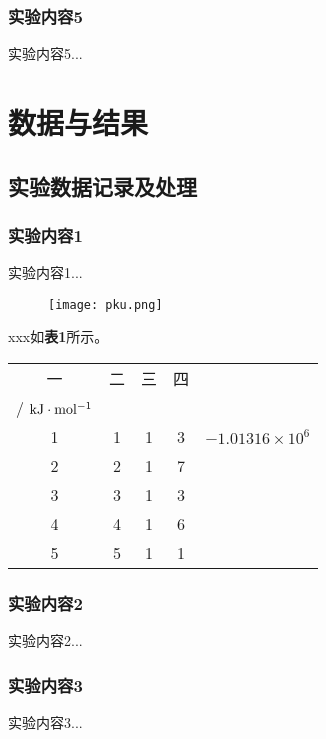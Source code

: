 \documentclass[12pt]{article}
\begin{document}
			\subsubsection{实验内容5}
				实验内容5...
    	
	\vbox{}  
	
	 \section{数据与结果}
 		\subsection{实验数据记录及处理}
 			\subsubsection{实验内容1}
 				实验内容1...
		 		 \begin{figure}[h]
		 			\centering
		 			\texttt{[image: pku.png]}
		 		\end{figure}
		 	
		 		xxx如\textbf{表1}所示。
		 		
		 		  \begin{table}[h]
		 			\centering
		 			\begin{tabular}{ccccc} 
		 				\toprule
		 				一 & 二 & 三 & 四 & \thead[c] {$E_{trans}$ \\ / $ \rm kJ \cdot mol^{-1} $} \\
		 				\midrule
		 				1 & 1 & 1 & 3 & $-1.01316\times10^{6}$ \\
		 				2 & 2 & 1 & 7 & \\
		 				3 & 3 & 1 & 3 & \\
		 				4 & 4 & 1 & 6 & \\
		 				5 & 5 & 1 & 1 & \\
		 				\bottomrule
		 			\end{tabular}
		 		\end{table}
		 		\vbox{}
 	
	 		\subsubsection{实验内容2}
	 			实验内容2...
	 		\subsubsection{实验内容3}
	 			实验内容3...
\end{document}
